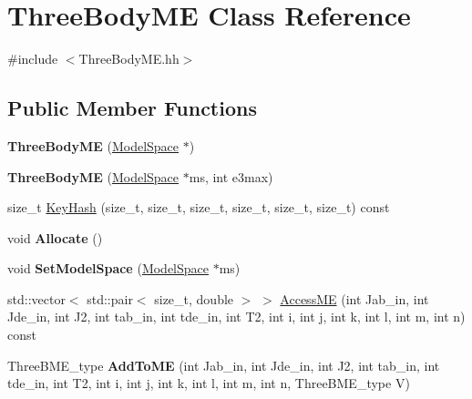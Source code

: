 \hypertarget{classThreeBodyME}{}\section{Three\+Body\+ME Class Reference}
\label{classThreeBodyME}


{\ttfamily \#include $<$Three\+Body\+M\+E.\+hh$>$}

\subsection*{Public Member Functions}
\begin{DoxyCompactItemize}
\item 
\mbox{\label{classThreeBodyME_aa172dc884e26dbb562ed525805565600}} 
{\bfseries Three\+Body\+ME} (\hyperlink{classModelSpace}{Model\+Space} $\ast$)
\item 
\mbox{\label{classThreeBodyME_a721d1713ef6d4e536090ec5dee898ff6}} 
{\bfseries Three\+Body\+ME} (\hyperlink{classModelSpace}{Model\+Space} $\ast$ms, int e3max)
\item 
size\+\_\+t \hyperlink{classThreeBodyME_a2e6c6bd8f5e5b4b07b74e6c643039cf7}{Key\+Hash} (size\+\_\+t, size\+\_\+t, size\+\_\+t, size\+\_\+t, size\+\_\+t, size\+\_\+t) const
\item 
\mbox{\label{classThreeBodyME_abf95672312aa4443d344cecd9e03dfb0}} 
void {\bfseries Allocate} ()
\item 
\mbox{\label{classThreeBodyME_a39846d400a5d63f70f79e14ebfb6c69c}} 
void {\bfseries Set\+Model\+Space} (\hyperlink{classModelSpace}{Model\+Space} $\ast$ms)
\item 
std\+::vector$<$ std\+::pair$<$ size\+\_\+t, double $>$ $>$ \hyperlink{classThreeBodyME_a682fbbfd17bc166f16f8361190ca27d4}{Access\+ME} (int Jab\+\_\+in, int Jde\+\_\+in, int J2, int tab\+\_\+in, int tde\+\_\+in, int T2, int i, int j, int k, int l, int m, int n) const
\item 
\mbox{\label{classThreeBodyME_a721b094496ab307b22d3a494557116ea}} 
Three\+B\+M\+E\+\_\+type {\bfseries Add\+To\+ME} (int Jab\+\_\+in, int Jde\+\_\+in, int J2, int tab\+\_\+in, int tde\+\_\+in, int T2, int i, int j, int k, int l, int m, int n, Three\+B\+M\+E\+\_\+type V)

\end{DoxyCompactItemize}
